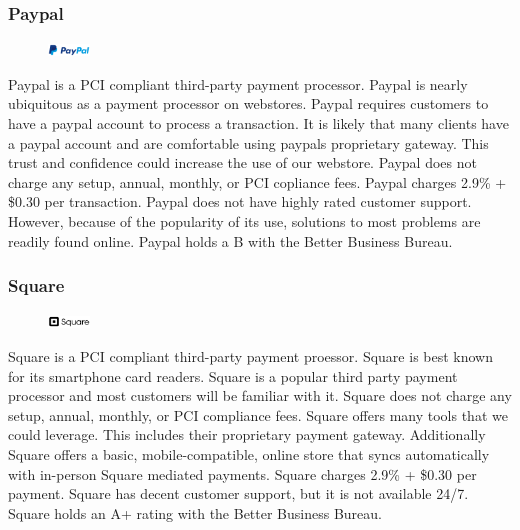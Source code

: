\documentclass[letterpaper]{article}
\begin{document}
      \subsubsection{Paypal}
        \begin{figure}
          \centering
          \includegraphics[width=0.1\textwidth]{paypal}
        \end{figure}
        Paypal is a PCI compliant third-party payment processor. Paypal is nearly ubiquitous as a payment processor on webstores. Paypal requires customers to have a paypal account to process a transaction.
        It is likely that many clients have a paypal account and are comfortable using paypals proprietary gateway. This trust and confidence
        could increase the use of our webstore. Paypal does not charge any setup, annual, monthly, or PCI copliance fees. Paypal charges 2.9\% + \$0.30 per transaction.
        Paypal does not have highly rated customer support. However, because of the popularity of its use, solutions to most problems are readily found online. Paypal holds a
        B with the Better Business Bureau.
      \subsubsection{Square}
        \begin{figure}
          \centering
          \includegraphics[width=0.1\textwidth]{square}
        \end{figure}
        Square is a PCI compliant third-party payment proessor. Square is best known for its smartphone card readers. Square is a popular third party payment processor and most customers will be
        familiar with it. Square does not charge any setup, annual, monthly, or PCI compliance fees. Square offers many tools that we could leverage.
        This includes their proprietary payment gateway. Additionally Square offers a basic, mobile-compatible, online store that syncs automatically with in-person Square mediated payments.
        Square charges 2.9\% + \$0.30 per payment. Square has decent customer support, but it is not available 24/7. Square holds an A+ rating with the Better Business Bureau.
\end{document}
